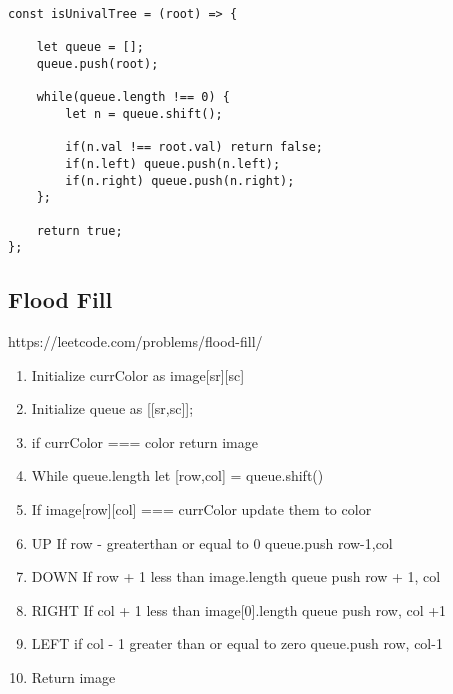 \documentclass[10pt]{article}
\begin{document}
\begin{lstlisting}[title=Solution isUnivalTree, captionpos=t]
const isUnivalTree = (root) => {
    
    let queue = [];
    queue.push(root);
    
    while(queue.length !== 0) {
        let n = queue.shift();
        
        if(n.val !== root.val) return false;
        if(n.left) queue.push(n.left);
        if(n.right) queue.push(n.right);
    };    
    
    return true;
};
\end{lstlisting}

\medskip %
















\pagebreak
\medskip   
\subsection {Flood Fill}
https://leetcode.com/problems/flood-fill/

\begin{enumerate}
	\item Initialize currColor as image[sr][sc]
	\item Initialize queue as [[sr,sc]];
	\item if currColor === color return image 
	\item While queue.length let [row,col] = queue.shift()
	\item If image[row][col] === currColor update them to color
	\item UP If row - greaterthan or equal to 0 queue.push row-1,col 
	\item DOWN If row + 1 less than image.length queue push row + 1, col
	\item RIGHT If col + 1 less than image[0].length queue push row, col +1
	\item LEFT if col - 1 greater than or equal to zero queue.push row, col-1
	\item Return image

\end{enumerate}
\end{document}
